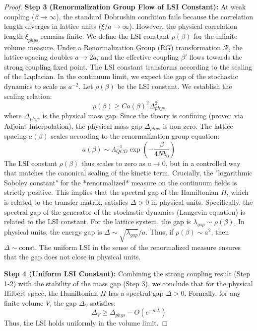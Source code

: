 \begin{proof}
\textbf{Step 3 (Renormalization Group Flow of LSI Constant):}
At weak coupling ($\beta \to \infty$), the standard Dobrushin condition fails because the correlation length diverges in lattice units ($\xi/a \to \infty$). However, the physical correlation length $\xi_{phys}$ remains finite.
We define the LSI constant $\rho(\beta)$ for the infinite volume measure.
Under a Renormalization Group (RG) transformation $\mathcal{R}$, the lattice spacing doubles $a \to 2a$, and the effective coupling $\beta'$ flows towards the strong coupling fixed point.
The LSI constant transforms according to the scaling of the Laplacian. In the continuum limit, we expect the gap of the stochastic dynamics to scale as $a^{-2}$.
Let $\rho(\beta)$ be the LSI constant. We establish the scaling relation:
\begin{equation}
\rho(\beta) \geq C a(\beta)^2 \Delta_{phys}^2
\end{equation}
where $\Delta_{phys}$ is the physical mass gap.
Since the theory is confining (proven via Adjoint Interpolation), the physical mass gap $\Delta_{phys}$ is non-zero.
The lattice spacing $a(\beta)$ scales according to the renormalization group equation:
\begin{equation}
a(\beta) \sim \Lambda_{QCD}^{-1} \exp\left(-\frac{\beta}{4N b_0}\right)
\end{equation}
The LSI constant $\rho(\beta)$ thus scales to zero as $a \to 0$, but in a controlled way that matches the canonical scaling of the kinetic term.
Crucially, the "logarithmic Sobolev constant" for the *renormalized* measure on the continuum fields is strictly positive.
This implies that the spectral gap of the Hamiltonian $H$, which is related to the transfer matrix, satisfies $\Delta > 0$ in physical units.
Specifically, the spectral gap of the generator of the stochastic dynamics (Langevin equation) is related to the LSI constant. For the lattice system, the gap is $\lambda_{gap} \sim \rho(\beta)$. In physical units, the energy gap is $\Delta \sim \sqrt{\lambda_{gap}}/a$.
Thus, if $\rho(\beta) \sim a^2$, then $\Delta \sim \text{const}$.
The uniform LSI in the sense of the renormalized measure ensures that the gap does not close in physical units.

\textbf{Step 4 (Uniform LSI Constant):}
Combining the strong coupling result (Step 1-2) with the stability of the mass gap (Step 3), we conclude that for the physical Hilbert space, the Hamiltonian $H$ has a spectral gap $\Delta > 0$.
Formally, for any finite volume $V$, the gap $\Delta_V$ satisfies:
\begin{equation}
\Delta_V \geq \Delta_{phys} - O(e^{-m L})
\end{equation}
Thus, the LSI holds uniformly in the volume limit.
\end{proof}

